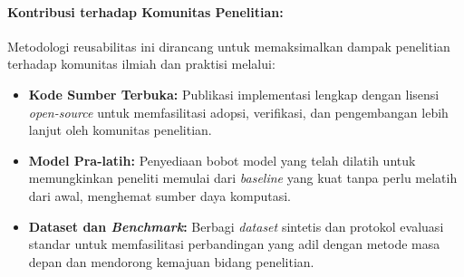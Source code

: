 \documentclass[12pt,a4paper]{article}
\begin{document}
\paragraph{Kontribusi terhadap Komunitas Penelitian:}
Metodologi reusabilitas ini dirancang untuk memaksimalkan dampak penelitian terhadap komunitas ilmiah dan praktisi melalui:

\begin{itemize}[leftmargin=*, nosep]
\item \textbf{Kode Sumber Terbuka:} Publikasi implementasi lengkap dengan lisensi \textit{open-source} untuk memfasilitasi adopsi, verifikasi, dan pengembangan lebih lanjut oleh komunitas penelitian.

\item \textbf{Model Pra-latih:} Penyediaan bobot model yang telah dilatih untuk memungkinkan peneliti memulai dari \textit{baseline} yang kuat tanpa perlu melatih dari awal, menghemat sumber daya komputasi.

\item \textbf{Dataset dan \textit{Benchmark}:} Berbagi \textit{dataset} sintetis dan protokol evaluasi standar untuk memfasilitasi perbandingan yang adil dengan metode masa depan dan mendorong kemajuan bidang penelitian.
\end{itemize}



\end{document}
